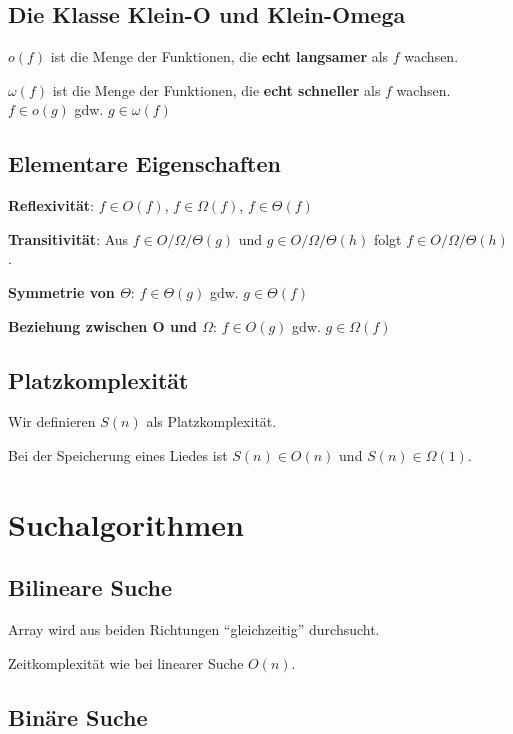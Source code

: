 \documentclass[12pt]{article}
\begin{document}
\subsection{Die Klasse Klein-O und Klein-Omega}

$o(f)$ ist die Menge der Funktionen, die \textbf{echt langsamer} als $f$ wachsen.

$\omega(f)$ ist die Menge der Funktionen, die \textbf{echt schneller} als $f$ wachsen.\\

$f \in o(g)$ gdw. $g \in \omega(f)$

\subsection{Elementare Eigenschaften}

\textbf{Reflexivität}: $f \in O(f)$, $f \in \Omega(f)$, $f \in \Theta(f)$

\textbf{Transitivität}: Aus $f \in O/\Omega/\Theta(g)$ und $g \in O/\Omega/\Theta(h)$ folgt $f \in O/\Omega/\Theta(h)$.

\textbf{Symmetrie von $\Theta$}: $f \in \Theta(g)$ gdw. $g \in \Theta(f)$

\textbf{Beziehung zwischen O und $\Omega$}: $f \in O(g)$ gdw. $g \in \Omega(f)$

\subsection{Platzkomplexität}

Wir definieren $S(n)$ als Platzkomplexität.

Bei der Speicherung eines Liedes ist $S(n) \in O(n)$ und $S(n) \in \Omega(1)$.

\section{Suchalgorithmen}

\subsection{Bilineare Suche}

Array wird aus beiden Richtungen \enquote{gleichzeitig} durchsucht.

Zeitkomplexität wie bei linearer Suche $O(n)$.

\subsection{Binäre Suche}
\end{document}
